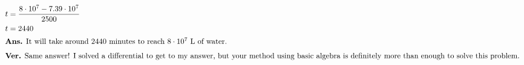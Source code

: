 \documentclass[12pt]{article}
\begin{document}
\begin{align}
  t                                                                                        & =\frac{8\cdot10^{7}-7.39\cdot10^{7}}{2500}                                                                                                                                \\
  t                                                                                        & =2440                                                                                                                                                                     \\
  \intertext{\textbf{Ans.} It will take around 2440 minutes to reach $8\cdot10^{7}$ L of water.}
  \intertext{\textbf{Ver.} Same answer! I solved a differential to get to my answer, but your method using basic algebra is definitely more than enough to solve this problem. }
\end{align}
\end{document}
